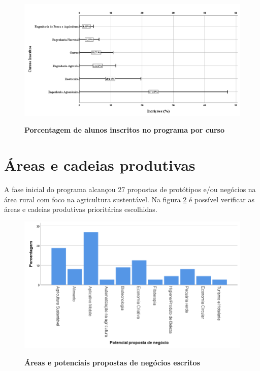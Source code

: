 \begin{figure}[!htb]
\caption{\textbf{Porcentagem de alunos inscritos no programa por curso}}
\centering
\includegraphics[scale=0.3]{Imagens/inscritos.png}
\label{figura_10}
\end{figure}



\section{Áreas e cadeias produtivas}

A fase inicial do programa alcançou 27 propostas de protótipos e/ou negócios na área rural com foco na agricultura sustentável. Na figura \ref{figura_11} é possível verificar as áreas e cadeias produtivas prioritárias escolhidas.

\begin{figure}[!htb]
\centering
\caption{\textbf{Áreas e potenciais propostas de negócios escritos}}
\includegraphics[scale=0.3]{Imagens/propostas_negocios.png}
\label{figura_11}
\end{figure}
\newpage

